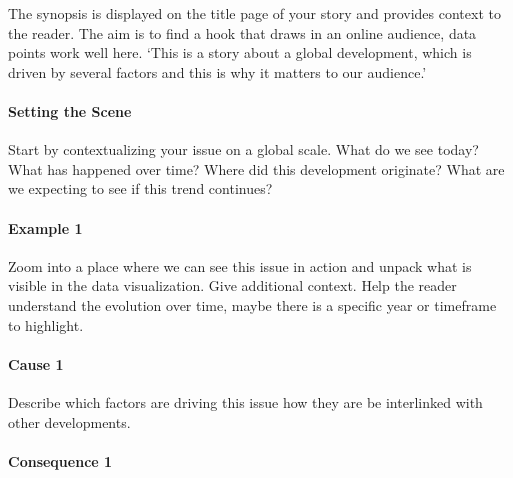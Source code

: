 \documentclass[
]{krantz}
\renewenvironment{quote}{\begin{VF}}{\end{VF}}
\begin{document}
\begin{quote}
The synopsis is displayed on the title page of your story and provides context to the reader. The aim is to find a hook that draws in an online audience, data points work well here. `This is a story about a global development, which is driven by several factors and this is why it matters to our audience.'
\end{quote}

\hypertarget{setting-the-scene}{%
\paragraph*{Setting the Scene}\label{setting-the-scene}}

\begin{quote}
Start by contextualizing your issue on a global scale. What do we see today? What has happened over time? Where did this development originate? What are we expecting to see if this trend continues?
\end{quote}

\hypertarget{example-1}{%
\paragraph*{Example 1}\label{example-1}}

\begin{quote}
Zoom into a place where we can see this issue in action and unpack what is visible in the data visualization. Give additional context. Help the reader understand the evolution over time, maybe there is a specific year or timeframe to highlight.
\end{quote}

\hypertarget{cause-1}{%
\paragraph*{Cause 1}\label{cause-1}}

\begin{quote}
Describe which factors are driving this issue how they are be interlinked with other developments.
\end{quote}

\hypertarget{consequence-1}{%
\paragraph*{Consequence 1}\label{consequence-1}}
\end{document}
